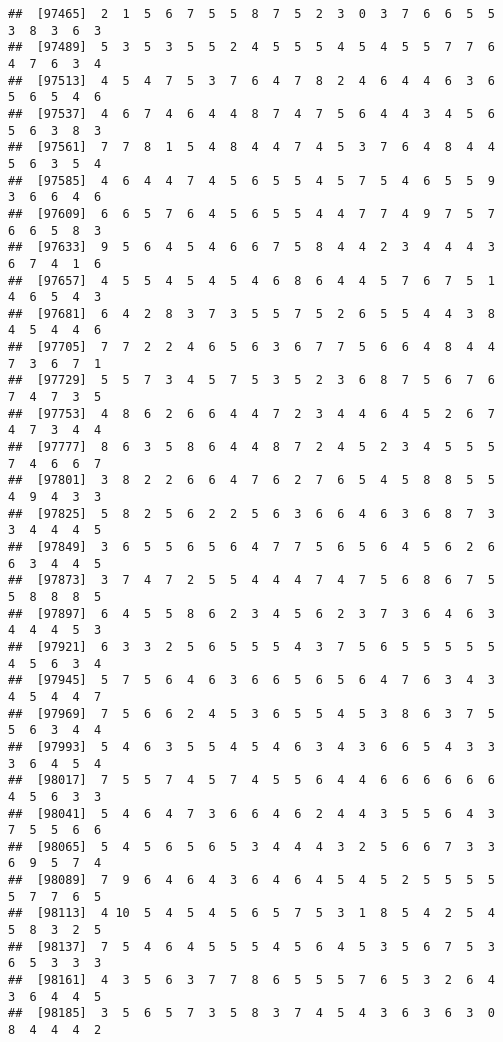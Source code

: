 \documentclass[
]{book}
\begin{document}
\begin{verbatim}
##  [97465]  2  1  5  6  7  5  5  8  7  5  2  3  0  3  7  6  6  5  5  3  8  3  6  3
##  [97489]  5  3  5  3  5  5  2  4  5  5  5  4  5  4  5  5  7  7  6  4  7  6  3  4
##  [97513]  4  5  4  7  5  3  7  6  4  7  8  2  4  6  4  4  6  3  6  5  6  5  4  6
##  [97537]  4  6  7  4  6  4  4  8  7  4  7  5  6  4  4  3  4  5  6  5  6  3  8  3
##  [97561]  7  7  8  1  5  4  8  4  4  7  4  5  3  7  6  4  8  4  4  5  6  3  5  4
##  [97585]  4  6  4  4  7  4  5  6  5  5  4  5  7  5  4  6  5  5  9  3  6  6  4  6
##  [97609]  6  6  5  7  6  4  5  6  5  5  4  4  7  7  4  9  7  5  7  6  6  5  8  3
##  [97633]  9  5  6  4  5  4  6  6  7  5  8  4  4  2  3  4  4  4  3  6  7  4  1  6
##  [97657]  4  5  5  4  5  4  5  4  6  8  6  4  4  5  7  6  7  5  1  4  6  5  4  3
##  [97681]  6  4  2  8  3  7  3  5  5  7  5  2  6  5  5  4  4  3  8  4  5  4  4  6
##  [97705]  7  7  2  2  4  6  5  6  3  6  7  7  5  6  6  4  8  4  4  7  3  6  7  1
##  [97729]  5  5  7  3  4  5  7  5  3  5  2  3  6  8  7  5  6  7  6  7  4  7  3  5
##  [97753]  4  8  6  2  6  6  4  4  7  2  3  4  4  6  4  5  2  6  7  4  7  3  4  4
##  [97777]  8  6  3  5  8  6  4  4  8  7  2  4  5  2  3  4  5  5  5  7  4  6  6  7
##  [97801]  3  8  2  2  6  6  4  7  6  2  7  6  5  4  5  8  8  5  5  4  9  4  3  3
##  [97825]  5  8  2  5  6  2  2  5  6  3  6  6  4  6  3  6  8  7  3  3  4  4  4  5
##  [97849]  3  6  5  5  6  5  6  4  7  7  5  6  5  6  4  5  6  2  6  6  3  4  4  5
##  [97873]  3  7  4  7  2  5  5  4  4  4  7  4  7  5  6  8  6  7  5  5  8  8  8  5
##  [97897]  6  4  5  5  8  6  2  3  4  5  6  2  3  7  3  6  4  6  3  4  4  4  5  3
##  [97921]  6  3  3  2  5  6  5  5  5  4  3  7  5  6  5  5  5  5  5  4  5  6  3  4
##  [97945]  5  7  5  6  4  6  3  6  6  5  6  5  6  4  7  6  3  4  3  4  5  4  4  7
##  [97969]  7  5  6  6  2  4  5  3  6  5  5  4  5  3  8  6  3  7  5  5  6  3  4  4
##  [97993]  5  4  6  3  5  5  4  5  4  6  3  4  3  6  6  5  4  3  3  3  6  4  5  4
##  [98017]  7  5  5  7  4  5  7  4  5  5  6  4  4  6  6  6  6  6  6  4  5  6  3  3
##  [98041]  5  4  6  4  7  3  6  6  4  6  2  4  4  3  5  5  6  4  3  7  5  5  6  6
##  [98065]  5  4  5  6  5  6  5  3  4  4  4  3  2  5  6  6  7  3  3  6  9  5  7  4
##  [98089]  7  9  6  4  6  4  3  6  4  6  4  5  4  5  2  5  5  5  5  5  7  7  6  5
##  [98113]  4 10  5  4  5  4  5  6  5  7  5  3  1  8  5  4  2  5  4  5  8  3  2  5
##  [98137]  7  5  4  6  4  5  5  5  4  5  6  4  5  3  5  6  7  5  3  6  5  3  3  3
##  [98161]  4  3  5  6  3  7  7  8  6  5  5  5  7  6  5  3  2  6  4  3  6  4  4  5
##  [98185]  3  5  6  5  7  3  5  8  3  7  4  5  4  3  6  3  6  3  0  8  4  4  4  2

\end{verbatim}
\end{document}
